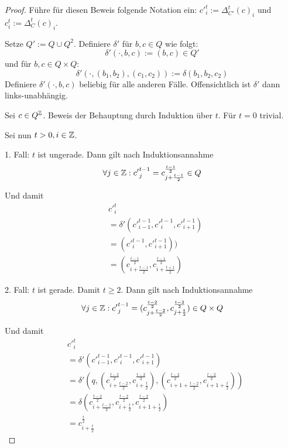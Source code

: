 \begin{proof}
    Führe für diesen Beweis folgende Notation ein: ${c'}^{t}_i := \Delta^{t}_{C'}(c)_i$ und $c^t_i := \Delta^{t}_{C}(c)_i$.
    
    Setze $Q' := Q \cup Q^2$. Definiere $\delta'$ für $ b, c \in Q$ wie folgt:
    \[
        \delta'(\cdot, b, c) := (b, c) \in Q'
    \]
    und für $b, c \in Q \times Q$:
    \[
        \delta'(\cdot, (b_1, b_2), (c_1, c_2)) := \delta(b_1, b_2, c_2)
    \]
    Definiere $\delta'(\cdot, b, c)$ beliebig für alle anderen Fälle. Offensichtlich ist $\delta'$ dann links-unabhängig.
    
    Sei $c \in Q^{\mathbb{Z}}$. Beweis der Behauptung durch Induktion über $t$. Für $t = 0$ trivial.
    
    Sei nun $t > 0, i \in \mathbb{Z}$.
    
    1. Fall: $t$ ist ungerade.
    Dann gilt nach Induktionsannahme
    \[
        \forall j \in \mathbb{Z}: {c'}^{t-1}_j = c^{\frac{t-1}{2}}_{j+\frac{t-1}{2}} \in Q
    \]
    
    Und damit
    \begin{align*}
        & {c'}^{t}_i \\
        &= \delta'({c'}^{t-1}_{i-1}, {c'}^{t-1}_i, {c'}^{t-1}_{i+1}) \\
        &= ({c'}^{t-1}_i, {c'}^{t-1}_{i+1})) \\
        &= (c^{\frac{t-1}{2}}_{i+\frac{t-1}{2}}, c^{\frac{t-1}{2}}_{i+\frac{t+1}{2}})
    \end{align*}
    
    2. Fall: $t$ ist gerade. Damit $t \geq 2$.
    Dann gilt nach Induktionsannahme
    \[
        \forall j \in \mathbb{Z}: {c'}^{t-1}_j
            = (c^{\frac{t-2}{2}}_{j+\frac{t-2}{2}}, c^{\frac{t-2}{2}}_{j+\frac{t}{2}}) \in Q \times Q
    \]
    
    Und damit
    \begin{align*}
        & {c'}^{t}_i \\
        &= \delta'({c'}^{t-1}_{i-1}, {c'}^{t-1}_i, {c'}^{t-1}_{i+1}) \\
        &= \delta'(q,  (c^{\frac{t-2}{2}}_{i+\frac{t-2}{2}}, c^{\frac{t-2}{2}}_{i+\frac{t}{2}}),
             (c^{\frac{t-2}{2}}_{i+1+\frac{t-2}{2}}, c^{\frac{t-2}{2}}_{i+1+\frac{t}{2}})) \\
        &= \delta(c^{\frac{t-2}{2}}_{i+\frac{t-2}{2}}, c^{\frac{t-2}{2}}_{i+\frac{t}{2}},
                c^{\frac{t-2}{2}}_{i+1+\frac{t}{2}}) \\
        &= c^{\frac{t}{2}}_{i+\frac{t}{2}}
    \end{align*}
    
\end{proof}

